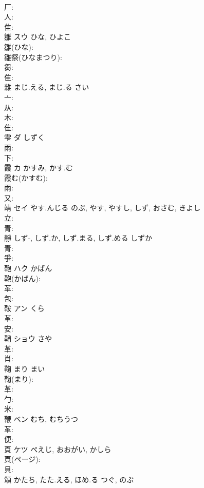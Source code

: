 \documentclass[8pt]{extreport}
\begin{document}
\begin{CJK}{UTF8}{min}
\\	厂: 
\\	人: 
\\	隹: 
\\	雛	スウ	ひな, ひよこ		
\\	雛(ひな): 
\\	雛祭(ひなまつり): 
\\	芻: 
\\	隹: 
\\	雜		まじ.える, まじ.る	さい			
\\	亠: 
\\	从: 
\\	木: 
\\	隹: 
\\	雫	ダ	しずく		
\\	雨: 
\\	下: 
\\	霞	カ	かすみ, かす.む		
\\	霞む(かすむ): 
\\	雨: 
\\	又: 
\\	靖	セイ	やす.んじる	のぶ, やす, やすし, しず, おさむ, きよし	
\\	立: 
\\	青: 
\\	靜		しず-, しず.か, しず.まる, しず.める	しずか			
\\	青: 
\\	爭: 
\\	鞄	ハク	かばん		
\\	鞄(かばん): 
\\	革: 
\\	包: 
\\	鞍	アン	くら		
\\	革: 
\\	安: 
\\	鞘	ショウ	さや		
\\	革: 
\\	肖: 
\\	鞠		まり	まい		
\\	鞠(まり): 
\\	革: 
\\	勹: 
\\	米: 
\\	鞭	ベン	むち, むちうつ		
\\	革: 
\\	便: 
\\	頁	ケツ	ぺえじ, おおがい, かしら		
\\	頁(ページ): 
\\	貝: 
\\	頌		かたち, たた.える, ほめ.る	つぐ, のぶ		

\end{CJK}
\end{document}
